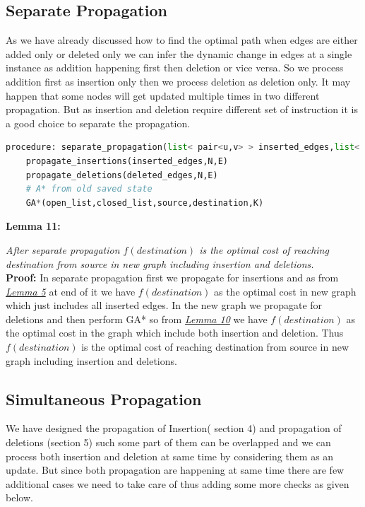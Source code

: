 \documentclass[a4paper]{article}
\begin{document}
\subsection{Separate Propagation }
As we have already discussed how to find the optimal path when edges are either added only or deleted only we can infer the dynamic change in edges at a single instance as addition happening first then deletion or vice versa. So we process addition first as insertion only then we process deletion as deletion only. It may happen that some nodes will get updated multiple times in two different propagation. But as insertion and deletion require different set of instruction it is a good choice to separate the propagation.
\begin{lstlisting}[language=python, caption=Separate Propagation]
procedure: separate_propagation(list< pair<u,v> > inserted_edges,list< pair<u,v> > deleted_edges,N,E)
    propagate_insertions(inserted_edges,N,E)
    propagate_deletions(deleted_edges,N,E)
    # A* from old saved state
    GA*(open_list,closed_list,source,destination,K)
\end{lstlisting}
\hypertarget{Lemma 11}{\textbf{Lemma 11:}} \textit{After separate propagation $f(destination)$ is the optimal cost of reaching destination from source in new graph including insertion and deletions.}\\
\textbf{Proof:} In separate propagation first we propagate for insertions and as from \hyperlink{Lemma 5}{\textit{Lemma 5}} at end of it we have $f(destination)$ as the optimal cost in new graph which just includes all inserted edges.
In the new graph we propagate for deletions and then perform GA* so from \hyperlink{Lemma 10}{\textit{Lemma 10}} we have $f(destination)$ as the optimal cost in the graph which include both insertion and deletion. Thus $f(destination)$ is the optimal cost of reaching destination from source in new graph including insertion and deletions.

\subsection{Simultaneous Propagation}
We have designed the propagation of Insertion( section 4) and propagation of deletions (section 5) such some part of them can be overlapped and we can process both insertion and deletion at same time by considering them as an update. But since both propagation are happening at same time there are few additional cases we need to take care of thus adding some more checks as given below.
\end{document}
